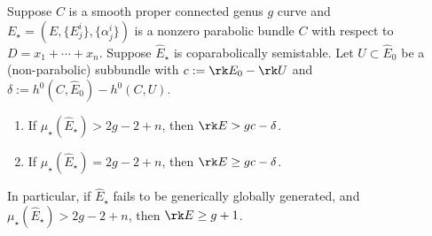 \begin{proposition}
\notready
	\label{proposition:generic-parabolic-global-generation}
	Suppose $C$ is a smooth proper connected genus $g$ curve and
	$E_\star = (E, \{E^i_j\}, \{\alpha^i_j\})$ is a nonzero parabolic bundle $C$
	with respect to $D = x_1 + \cdots + x_n$.
		Suppose $\widehat{E}_\star$ is coparabolically semistable.
		Let $U \subset \widehat E_0$ be a (non-parabolic) subbundle with
		$c := \rk E_0 - \rk U$
		and
		$\delta := h^0(C, \widehat{E}_0) - h^0(C, U)$.
	\begin{enumerate}
		\item[(I)] If $\mu_\star(\widehat{E}_\star)> 2g-2 + n$,
		then $\rk E >
			gc - \delta$.
		\item[(II)] If $\mu_\star(\widehat{E}_\star)= 2g-2+n$, then $\rk
			E \geq gc - \delta$.
	\end{enumerate}
	In particular, if $\widehat{E}_\star$
	fails to be generically globally generated, and
	$\mu_\star(\widehat{E}_\star)> 2g-2 + n$, then $\rk E \geq g	+ 1$.
\end{proposition}

